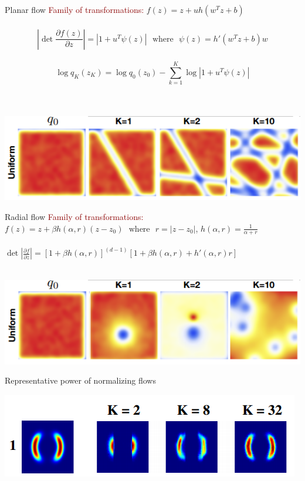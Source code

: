 \documentclass[unicode,11pt]{beamer}
\begin{document}
\begin{frame}[fragile]{Planar flow}
  \textcolor{darkred}{Family of transformations:} $f(z) = z + uh\left( w^T z + b \right)$\\
  ~\\
  $$\left\vert \det \frac{\partial f(z)}{\partial z} \right\vert = \left\vert 1 + u^T \psi(z)
  \right\vert ~~~\text{where}~~~ \psi(z) = h'(w^Tz + b)w$$ \\
  $$\log q_K(z_K) = \log q_0(z_0) − \sum_{k=1}^K \log \left\vert 1 + u^T \psi(z) \right\vert $$\\
  ~\\

  \begin{center}
    \includegraphics[width=.8\textwidth]{images/planar_flow}
  \end{center}
\end{frame}


\begin{frame}[fragile]{Radial flow}
  \textcolor{darkred}{Family of transformations:} \\
  $f(z) = z + \beta h(\alpha, r)(z-z_0) ~~~\text{where}~~~ r = \vert z-z_0 \vert$,
  $h(\alpha, r) = \frac{1}{\alpha + r}$\\
  ~\\
  $\det \left\vert \frac{\partial f}{\partial z} \right\vert = [1 + \beta h(\alpha, r)]^{(d-1)}
  [1 + \beta h(\alpha, r) + h'(\alpha, r) r]$\\
  ~\\

  \begin{center}
    \includegraphics[width=.8\textwidth]{images/radial_flow}
  \end{center}
\end{frame}


\begin{frame}[fragile]{Representative power of normalizing flows}
  \begin{center}
    \includegraphics[width=.8\textwidth]{images/normalizing_flow}
  \end{center}
\end{frame}
\end{document}
